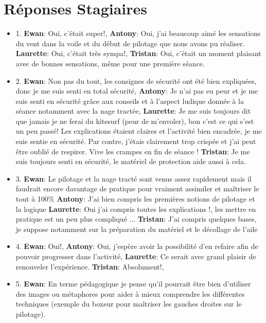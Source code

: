 \documentclass[11pt,a4paper]{report}
\begin{document}
\chapter{Réponses Stagiaires\label{reponses}}

\begin{itemize}
\item 1. \textbf{Ewan}: Oui, c'était super!, \textbf{Antony}: Oui, j'ai
beaucoup aimé les sensations du vent  dans la voile et du début de
pilotage que nous avons  pu réaliser.                                      
\textbf{Laurette}: Oui, c'était très sympa!, \textbf{Tristan}: Oui,
c'était un moment plaisant avec de bonnes sensations, m\^eme pour
une première séance.
\item 2. \textbf{Ewan}: Non pas du tout, les consignes de sécurité
ont été bien expliquées, donc je me suis senti en total sécurité,
\textbf{Antony}: Je n'ai pas eu peur et je me suis senti en
sécurité gr\^ace aux conseils et à l'aspect ludique donnée à la séance 
notamment avec la nage tractée, \textbf{Laurette}: Je me suis
toujours dit que jamais je ne ferai du kitesurf (peur de m'envoler),
bon c'est ce qui s'est un peu passé! Les explications étaient 
claires et l'activité bien encadrée, je me suis sentie en sécurité.
Par contre, j'étais clairement trop crispée et j'ai peut \^etre
oublié de respirer. Vive les crampes en fin de séance ! 
\textbf{Tristan}: Je me suis toujours senti en sécurité, le matériel
de protection aide aussi à cela.
\item 3. \textbf{Ewan}: Le pilotage et la nage tracté sont venus
assez rapidement mais il faudrait encore davantage de pratique
pour vraiment assimiler et maîtriser le tout à 100\%
\textbf{Antony}: J'ai bien compris les premières notions de
pilotage et la logique \textbf{Laurette}: Oui j'ai compris
toutes les explications !, les mettre en pratique est un
peu plus compliqué ...
\textbf{Tristan}: J'ai compris quelques bases, je suppose
notamment sur la préparation du matériel et le décollage de l'aile
\item 4. \textbf{Ewan}: Oui!, \textbf{Antony}: Oui, j'espère
avoir la possibilité d'en refaire afin de pouvoir progresser
dans l'activité, \textbf{Laurette}: Ce serait avec grand plaisir
de renouveler l'expérience.
\textbf{Tristan}: Absolument!, 
\item 5. \textbf{Ewan}: En terme pédagogique je pense qu'il
pourrait \^etre bien d'utiliser des images ou métaphores pour
aider à mieux comprendre les différentes techniques (exemple
du boxeur pour maîtriser les gauches droites sur le  pilotage).

\end{itemize}
\end{document}
